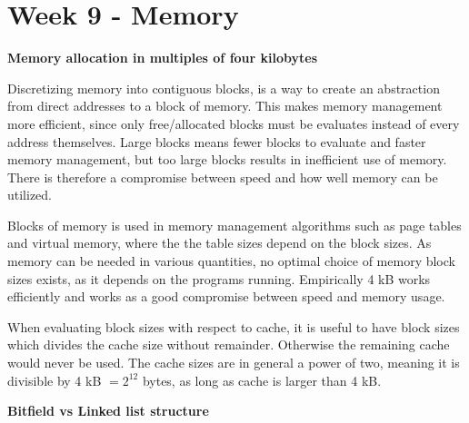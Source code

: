\section{Week 9 - Memory}


\textbf{Memory allocation in multiples of four kilobytes}

Discretizing memory into contiguous blocks, is a way to create an abstraction from direct addresses to a block of memory. This makes memory management more efficient, since only free/allocated blocks must be evaluates instead of every address themselves. Large blocks means fewer blocks to evaluate and faster memory management, but too large blocks results in inefficient use of memory. There is therefore a compromise between speed and how well memory can be utilized.

Blocks of memory is used in memory management algorithms such as page tables and virtual memory, where the the table sizes depend on the block sizes. As memory can be needed in various quantities, no optimal choice of memory block sizes exists, as it depends on the programs running. Empirically 4 kB works efficiently and works as a good compromise between speed and memory usage.

When evaluating block sizes with respect to cache, it is useful to have block sizes which divides the cache size without remainder. Otherwise the remaining cache would never be used. The cache sizes are in general a power of two, meaning it is divisible by 4 kB $= 2^{12}$ bytes, as long as cache is larger than 4 kB.

\textbf{Bitfield vs Linked list structure}

